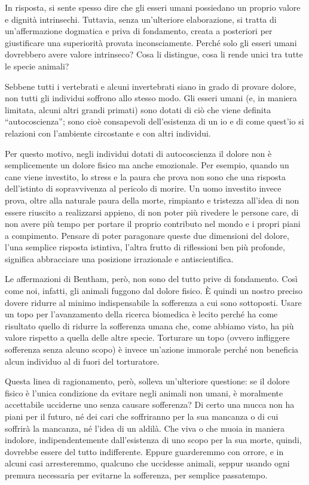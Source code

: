 \documentclass[a4paper,11pt,oneside,article]{memoir}
\begin{document}
In risposta, si sente spesso dire che gli esseri umani possiedano un proprio
valore e dignità intrinsechi. Tuttavia, senza un'ulteriore elaborazione, si
tratta di un'affermazione dogmatica e priva di fondamento, creata a posteriori
per giustificare una superiorità provata inconsciamente. Perché solo gli esseri
umani dovrebbero avere valore intrinseco? Cosa li distingue, cosa li rende unici
tra tutte le specie animali?

Sebbene tutti i vertebrati e alcuni invertebrati siano in grado di provare
dolore, non tutti gli individui soffrono allo stesso modo. Gli esseri umani (e,
in maniera limitata, alcuni altri grandi primati) sono dotati di ciò che viene
definita ``autocoscienza''; sono cioè consapevoli dell'esistenza di un io e di
come quest'io si relazioni con l'ambiente circostante e con altri individui.

Per questo motivo, negli individui dotati di autocoscienza il dolore non è
semplicemente un dolore fisico ma anche emozionale. Per esempio, quando un cane
viene investito, lo stress e la paura che prova non sono che una risposta
dell'istinto di sopravvivenza al pericolo di morire. Un uomo investito invece
prova, oltre alla naturale paura della morte, rimpianto e tristezza all'idea di
non essere riuscito a realizzarsi appieno, di non poter più rivedere le persone
care, di non avere più tempo per portare il proprio contributo nel mondo e i
propri piani a compimento. Pensare di poter paragonare queste due dimensioni del
dolore, l'una semplice risposta istintiva, l'altra frutto di riflessioni ben più
profonde, significa abbracciare una posizione irrazionale e antiscientifica.

Le affermazioni di Bentham, però, non sono del tutto prive di fondamento. Così
come noi, infatti, gli animali fuggono dal dolore fisico. È quindi un nostro
preciso dovere ridurre al minimo indispensabile la sofferenza a cui sono
sottoposti. Usare un topo per l'avanzamento della ricerca biomedica è lecito
perché ha come risultato quello di ridurre la sofferenza umana che, come abbiamo
visto, ha più valore rispetto a quella delle altre specie. Torturare un topo
(ovvero infliggere sofferenza senza alcuno scopo) è invece un'azione immorale
perché non beneficia alcun individuo al di fuori del torturatore.

Questa linea di ragionamento, però, solleva un'ulteriore questione: se il dolore
fisico è l'unica condizione da evitare negli animali non umani, è moralmente
accettabile ucciderne uno senza causare sofferenza? Di certo una mucca non ha
piani per il futuro, né dei cari che soffriranno per la sua mancanza o di cui
soffrirà la mancanza, né l'idea di un aldilà. Che viva o che muoia in maniera
indolore, indipendentemente dall'esistenza di uno scopo per la sua morte,
quindi, dovrebbe essere del tutto indifferente. Eppure guarderemmo con orrore, e
in alcuni casi arresteremmo, qualcuno che uccidesse animali, seppur usando ogni
premura necessaria per evitarne la sofferenza, per semplice passatempo.
\end{document}
